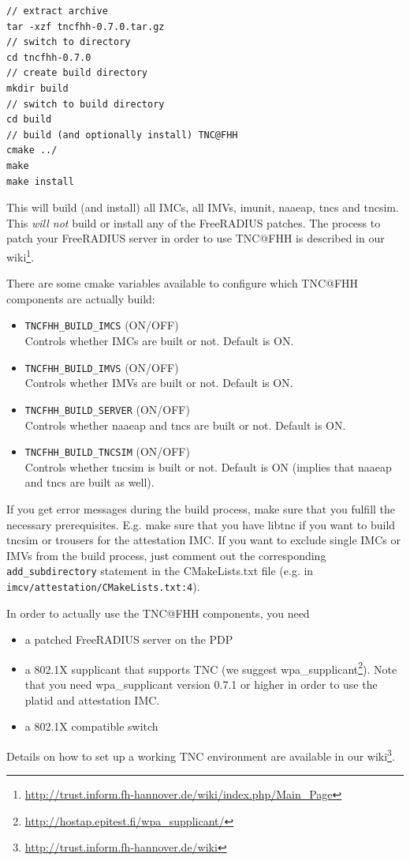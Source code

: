 \documentclass[a4paper,10pt]{scrartcl}
\begin{document}
\begin{lstlisting}
// extract archive
tar -xzf tncfhh-0.7.0.tar.gz
// switch to directory
cd tncfhh-0.7.0
// create build directory
mkdir build
// switch to build directory
cd build
// build (and optionally install) TNC@FHH
cmake ../
make
make install
\end{lstlisting}

This will build (and install) all IMCs, all IMVs, imunit, naaeap, tncs and tncsim. This
\emph{will not} build or install any of the FreeRADIUS patches. The process to patch your FreeRADIUS server in order to use TNC@FHH is described in our wiki\footnote{\url{http://trust.inform.fh-hannover.de/wiki/index.php/Main_Page}}.

There are some cmake variables available to configure which TNC@FHH components are actually build:
\begin{itemize}
	\item \texttt{TNCFHH\_BUILD\_IMCS} (ON/OFF)\\ Controls whether IMCs are built or not. Default is ON.
	\item \texttt{TNCFHH\_BUILD\_IMVS} (ON/OFF)\\ Controls whether IMVs are built or not. Default is ON.
	\item \texttt{TNCFHH\_BUILD\_SERVER} (ON/OFF)\\ Controls whether naaeap and tncs are built or not. Default is ON.
	\item \texttt{TNCFHH\_BUILD\_TNCSIM} (ON/OFF)\\ Controls whether tncsim is built or not. Default is ON (implies that
	naaeap and tncs are built as well).
\end{itemize}

If you get error messages during the  build process, make sure that you fulfill the necessary prerequisites. E.g. make sure that you have libtnc
if you want to build tncsim or trousers for the attestation IMC. If you want to exclude single IMCs or IMVs from the build process, just comment out
the corresponding \texttt{add\_subdirectory} statement in the CMakeLists.txt file (e.g. in \texttt{imcv/attestation/CMakeLists.txt:4}).

In order to actually use the TNC@FHH components, you need
\begin{itemize}
	\item a patched FreeRADIUS server on the PDP
	\item a 802.1X supplicant that supports TNC (we suggest wpa\_supplicant\footnote{\url{http://hostap.epitest.fi/wpa_supplicant/}}). Note that you need wpa\_supplicant version 0.7.1 or higher in order to use the platid and attestation IMC.
	\item a 802.1X compatible switch
\end{itemize}
Details on how to set up a working TNC environment are available in our wiki\footnote{\url{http://trust.inform.fh-hannover.de/wiki}}.
\end{document}
